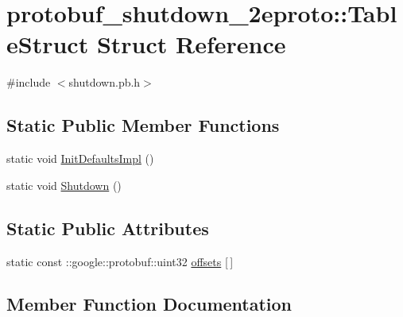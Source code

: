 \hypertarget{structprotobuf__shutdown__2eproto_1_1_table_struct}{}\section{protobuf\+\_\+shutdown\+\_\+2eproto\+:\+:Table\+Struct Struct Reference}
\label{structprotobuf__shutdown__2eproto_1_1_table_struct}


{\ttfamily \#include $<$shutdown.\+pb.\+h$>$}

\subsection*{Static Public Member Functions}
\begin{DoxyCompactItemize}
\item 
static void \hyperlink{structprotobuf__shutdown__2eproto_1_1_table_struct_abc38228d85b6a3e9c9fc53fdb441e3d8}{Init\+Defaults\+Impl} ()
\item 
static void \hyperlink{structprotobuf__shutdown__2eproto_1_1_table_struct_aeff97b92b158debe579f008660200faf}{Shutdown} ()
\end{DoxyCompactItemize}
\subsection*{Static Public Attributes}
\begin{DoxyCompactItemize}
\item 
static const \+::google\+::protobuf\+::uint32 \hyperlink{structprotobuf__shutdown__2eproto_1_1_table_struct_a94a26cb4e92cde7ab04e2e80f102a7d2}{offsets} \mbox{[}$\,$\mbox{]}
\end{DoxyCompactItemize}


\subsection{Member Function Documentation}
